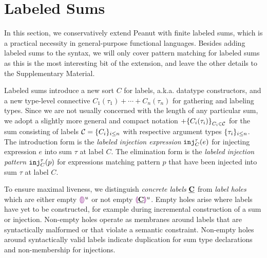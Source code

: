 \section{Labeled Sums}\label{sec:labeledsums}

In this section, we conservatively extend Peanut with finite labeled
sums, which is a practical necessity in general-purpose functional
languages. Besides adding labeled sums to the syntax, we will only cover
pattern matching for labeled sums as this is the most interesting bit
of the extension, and leave the other details to the Supplementary Material.

Labeled sums introduce a new sort $C$ for labels, a.k.a. datatype constructors, and a new type-level connective $C_1(\tau_1) + \cdots + C_n(\tau_n)$ for gathering and labeling types.
Since we are not usually concerned with the length of any particular sum,
we adopt a slightly more general and compact notation $+\mathopen{}\left\{C_i(\tau_i)\right\}_{C_i \in \mathcal{C}}$
for the sum consisting of labels $\mathcal{C} = \{C_i\}_{i \leq n}$ with respective argument types $\{\tau_i\}_{i \leq n}$.
The introduction form is the \emph{labeled injection expression} $\mathtt{inj}_{C}^{\tau}({e})$ for injecting expression $e$ into sum $\tau$ at label $C$.
The elimination form is the \emph{labeled injection pattern} $\mathtt{inj}_{C}^{\tau}({p})$ 
for expressions matching pattern $p$ that have been injected into sum $\tau$ at label $C$.

To ensure maximal liveness, we distinguish \emph{concrete labels} $\underline{\mathbf{C}}$
from \emph{label holes} which are either empty $\textcolor{violet}{\llparenthesis}\textcolor{violet}{\rrparenthesis}^{u}$ or not empty $\textcolor{violet}{\llparenthesis}\underline{\mathbf{C}}\textcolor{violet}{\rrparenthesis}^{u}$.
Empty holes arise where labels have yet to be constructed, for example during incremental construction of a sum or injection.
Non-empty holes operate as membranes around labels that are syntactically malformed or that violate a semantic constraint.
Non-empty holes around syntactically valid labels indicate duplication for sum type declarations and non-membership for injections.



